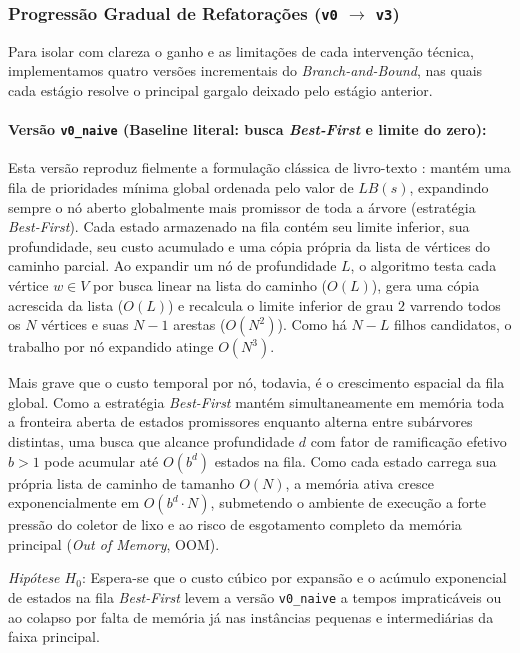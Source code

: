 \subsubsection{Progressão Gradual de Refatorações (\texttt{v0} \texorpdfstring{$\rightarrow$}{->} \texttt{v3})}
\label{sec:bnb_versoes}

Para isolar com clareza o ganho e as limitações de cada intervenção técnica, implementamos
quatro versões incrementais do \textit{Branch-and-Bound}, nas quais cada estágio resolve o
principal gargalo deixado pelo estágio anterior.

\paragraph{Versão \texttt{v0\_naive} (Baseline literal: busca \textit{Best-First} e limite do zero):}
Esta versão reproduz fielmente a formulação clássica de livro-texto \cite{levitin2012design}:
mantém uma fila de prioridades mínima global ordenada pelo valor de $LB(s)$, expandindo sempre
o nó aberto globalmente mais promissor de toda a árvore (estratégia \textit{Best-First}). Cada
estado armazenado na fila contém seu limite inferior, sua profundidade, seu custo acumulado e
uma cópia própria da lista de vértices do caminho parcial. Ao expandir um nó de profundidade
$L$, o algoritmo testa cada vértice $w \in V$ por busca linear na lista do caminho ($O(L)$),
gera uma cópia acrescida da lista ($O(L)$) e recalcula o limite inferior de grau $2$ varrendo
todos os $N$ vértices e suas $N - 1$ arestas ($O(N^2)$). Como há $N - L$ filhos candidatos, o
trabalho por nó expandido atinge $O(N^3)$.

Mais grave que o custo temporal por nó, todavia, é o crescimento espacial da fila global.
Como a estratégia \textit{Best-First} mantém simultaneamente em memória toda a fronteira aberta
de estados promissores enquanto alterna entre subárvores distintas, uma busca que alcance
profundidade $d$ com fator de ramificação efetivo $b > 1$ pode acumular até $O(b^d)$ estados na
fila. Como cada estado carrega sua própria lista de caminho de tamanho $O(N)$, a memória ativa
cresce exponencialmente em $O(b^d \cdot N)$, submetendo o ambiente de execução a forte pressão
do coletor de lixo e ao risco de esgotamento completo da memória principal (\textit{Out of
Memory}, OOM).

\textit{Hipótese $H_0$}: Espera-se que o custo cúbico por expansão e o acúmulo exponencial de
estados na fila \textit{Best-First} levem a versão \texttt{v0\_naive} a tempos impraticáveis ou
ao colapso por falta de memória já nas instâncias pequenas e intermediárias da faixa principal.

